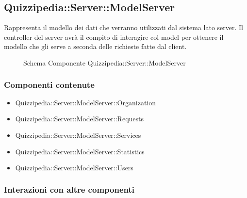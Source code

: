 \subsection{Quizzipedia::Server::ModelServer}
Rappresenta il modello dei dati che verranno utilizzati dal sistema lato server. 
Il controller del server avrà il compito di interagire col model per ottenere il modello che gli serve a seconda delle richieste fatte dal client.
\begin{figure}[H]
\centering
\noindent{}
\caption[Schema Componente Quizzipedia::Server::ModelServer]{Schema Componente Quizzipedia::Server::ModelServer}
\end{figure}
\subsubsection{Componenti contenute}
\begin{itemize}
\item Quizzipedia::Server::ModelServer::Organization
\item Quizzipedia::Server::ModelServer::Requests
\item Quizzipedia::Server::ModelServer::Services
\item Quizzipedia::Server::ModelServer::Statistics
\item Quizzipedia::Server::ModelServer::Users
\end{itemize}
\subsubsection{Interazioni con altre componenti}
